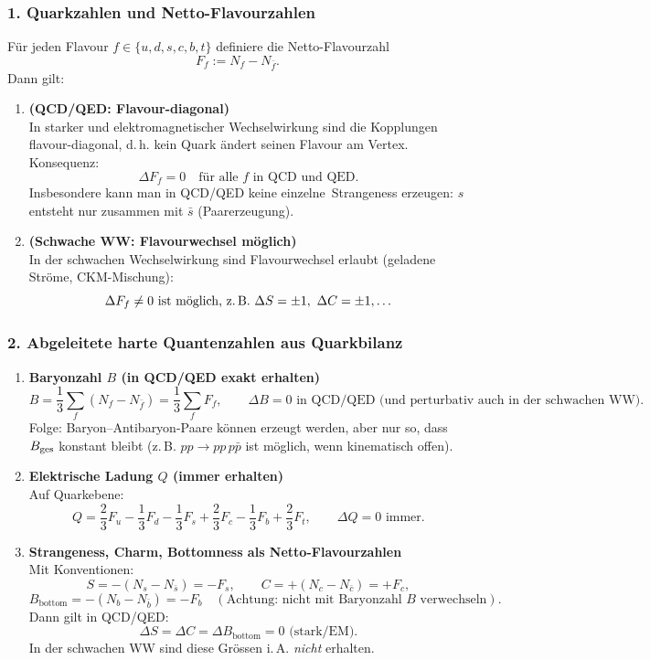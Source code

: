 \documentclass[10pt, letterpaper]{article}
\begin{document}
\subsubsection*{1. Quarkzahlen und Netto-Flavourzahlen}

Für jeden Flavour $f\in\{u,d,s,c,b,t\}$ definiere die Netto-Flavourzahl
\[
F_f := N_f - N_{\bar f}.
\]
Dann gilt:

\begin{enumerate}
\item \textbf{(QCD/QED: Flavour-diagonal)}\\
In starker und elektromagnetischer Wechselwirkung sind die Kopplungen flavour-diagonal, d.\,h.
kein Quark ändert seinen Flavour am Vertex. Konsequenz:
\[
\boxed{\Delta F_f = 0 \quad \text{für alle } f \text{ in QCD und QED.}}
\]
Insbesondere kann man in QCD/QED keine \glqq einzelne\grqq\ Strangeness erzeugen:
$s$ entsteht nur zusammen mit $\bar s$ (Paarerzeugung).

\item \textbf{(Schwache WW: Flavourwechsel möglich)}\\
In der schwachen Wechselwirkung sind Flavourwechsel erlaubt (geladene Ströme, CKM-Mischung):
\[
\Delta F_f \neq 0 \ \text{ist möglich, z.\,B.}\ \Delta S=\pm 1,\ \Delta C=\pm 1,\ldots
\]
\end{enumerate}

\subsubsection*{2. Abgeleitete harte Quantenzahlen aus Quarkbilanz}

\begin{enumerate}
\item \textbf{Baryonzahl $B$ (in QCD/QED exakt erhalten)}\\
\[
B = \frac{1}{3}\sum_f (N_f - N_{\bar f}) = \frac{1}{3}\sum_f F_f,
\qquad
\boxed{\Delta B = 0 \text{ in QCD/QED (und perturbativ auch in der schwachen WW).}}
\]
Folge: Baryon--Antibaryon-Paare können erzeugt werden, aber nur so, dass $B_{\rm ges}$ konstant bleibt
(z.\,B. $pp\to pp\,p\bar p$ ist möglich, wenn kinematisch offen).

\item \textbf{Elektrische Ladung $Q$ (immer erhalten)}\\
Auf Quarkebene:
\[
Q = \frac{2}{3}F_u - \frac{1}{3}F_d - \frac{1}{3}F_s + \frac{2}{3}F_c - \frac{1}{3}F_b + \frac{2}{3}F_t,
\qquad
\boxed{\Delta Q = 0 \text{ immer.}}
\]

\item \textbf{Strangeness, Charm, Bottomness als Netto-Flavourzahlen}\\
Mit Konventionen:
\[
S = -(N_s-N_{\bar s}) = -F_s,\qquad
C = +(N_c-N_{\bar c}) = +F_c,
\]
\[
B_{\text{bottom}} = -(N_b-N_{\bar b}) = -F_b \quad
(\text{Achtung: nicht mit Baryonzahl } B \text{ verwechseln}).
\]
Dann gilt in QCD/QED:
\[
\boxed{\Delta S=\Delta C=\Delta B_{\text{bottom}}=0 \text{ (stark/EM).}}
\]
In der schwachen WW sind diese Grössen i.\,A. \emph{nicht} erhalten.

\end{enumerate}
\end{document}
